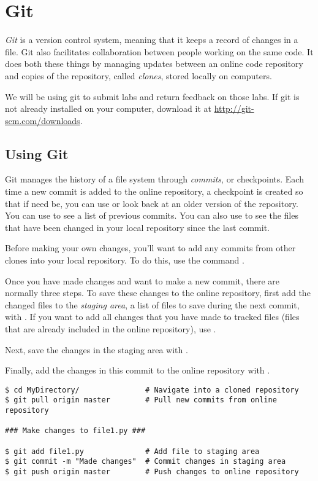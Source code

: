 \section*{Git} %
\emph{Git} is a version control system, meaning that it keeps a record of changes in a file.
Git also facilitates collaboration between people working on the same code.
It does both these things by managing updates between an online code repository and copies of the repository, called \emph{clones}, stored locally on computers.

We will be using git to submit labs and return feedback on those labs. If git is not already installed on your computer, download it at \url{http://git-scm.com/downloads}.

\subsection*{Using Git} %
Git manages the history of a file system through \emph{commits}, or checkpoints.
Each time a new commit is added to the online repository, a checkpoint is created so that if need be, you can use or look back at an older version of the repository.
You can use  to see a list of previous commits.
You can also use  to see the files that have been changed in your local repository since the last commit.

Before making your own changes, you'll want to add any commits from other clones into your local repository.
To do this, use the command .

Once you have made changes and want to make a new commit, there are normally three steps.
To save these changes to the online repository, first add the changed files to the \emph{staging area}, a list of files to save during the next commit, with .
If you want to add all changes that you have made to tracked files (files that are already included in the online repository), use .

Next, save the changes in the staging area with .

Finally, add the changes in this commit to the online repository with .

\begin{lstlisting}
$ cd MyDirectory/				# Navigate into a cloned repository
$ git pull origin master		# Pull new commits from online repository

### Make changes to file1.py ###

$ git add file1.py				# Add file to staging area
$ git commit -m "Made changes" 	# Commit changes in staging area
$ git push origin master 		# Push changes to online repository
\end{lstlisting}


